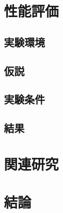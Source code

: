 \documentclass[submit]{ipsj}
\begin{document}
\section{性能評価}
\subsection{実験環境}
\subsection{仮説}
\subsection{実験条件}
\subsection{結果}

\section{関連研究}

\section{結論}
\end{document}
